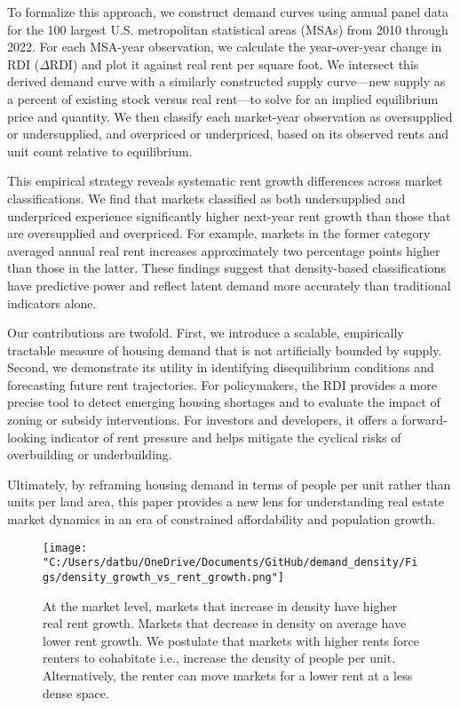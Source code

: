 \documentclass[sn-mathphys-num]{sn-jnl}%
\theoremstyle{thmstyleone}%
\theoremstyle{thmstyletwo}%
\theoremstyle{thmstylethree}%
\begin{document}
To formalize this approach, we construct demand curves using annual panel data for the 100 largest U.S. metropolitan statistical areas (MSAs) from 2010 through 2022. For each MSA-year observation, we calculate the year-over-year change in RDI (\( \Delta \text{RDI} \)) and plot it against real rent per square foot. We intersect this derived demand curve with a similarly constructed supply curve---new supply as a percent of existing stock versus real rent---to solve for an implied equilibrium price and quantity. We then classify each market-year observation as oversupplied or undersupplied, and overpriced or underpriced, based on its observed rents and unit count relative to equilibrium.

This empirical strategy reveals systematic rent growth differences across market classifications. We find that markets classified as both undersupplied and underpriced experience significantly higher next-year rent growth than those that are oversupplied and overpriced. For example, markets in the former category averaged annual real rent increases approximately two percentage points higher than those in the latter. These findings suggest that density-based classifications have predictive power and reflect latent demand more accurately than traditional indicators alone.

Our contributions are twofold. First, we introduce a scalable, empirically tractable measure of housing demand that is not artificially bounded by supply. Second, we demonstrate its utility in identifying disequilibrium conditions and forecasting future rent trajectories. For policymakers, the RDI provides a more precise tool to detect emerging housing shortages and to evaluate the impact of zoning or subsidy interventions. For investors and developers, it offers a forward-looking indicator of rent pressure and helps mitigate the cyclical risks of overbuilding or underbuilding.

Ultimately, by reframing housing demand in terms of people per unit rather than units per land area, this paper provides a new lens for understanding real estate market dynamics in an era of constrained affordability and population growth.


\begin{figure}[H]
	\centering
	\texttt{[image: "C:/Users/datbu/OneDrive/Documents/GitHub/demand\_density/Figs/density\_growth\_vs\_rent\_growth.png"]}
	\caption{At the market level, markets that increase in density have higher real rent growth. Markets that decrease in density on average have lower rent growth. We postulate that markets with higher rents force renters to cohabitate i.e., increase the density of people per unit. Alternatively, the renter can move markets for a lower rent at a less dense space.}\label{fig1}
\end{figure}
\end{document}
